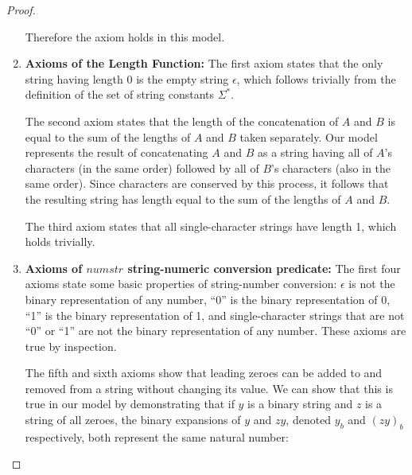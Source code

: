 \begin{proof}
\begin{enumerate}
  Therefore the axiom holds in this model.


\item \textbf{Axioms of the Length Function:} The first axiom states
  that the only string having length 0 is the empty string $\epsilon$,
  which follows trivially from the definition of the set of string
  constants $\Sigma^{*}$.

  The second axiom states that the length of the concatenation of $A$
  and $B$ is equal to the sum of the lengths of $A$ and $B$ taken
  separately.  Our model represents the result of concatenating $A$
  and $B$ as a string having all of $A$'s characters (in the same
  order) followed by all of $B$'s characters (also in the same
  order). Since characters are conserved by this process, it follows
  that the resulting string has length equal to the sum of the lengths
  of $A$ and $B$.

  The third axiom states that all single-character strings have length
  1, which holds trivially.


\item \textbf{Axioms of $numstr$ string-numeric conversion predicate:}
  The first four axioms state some basic properties of string-number
  conversion: $\epsilon$ is not the binary representation of any
  number, ``0'' is the binary representation of 0, ``1'' is the binary
  representation of 1, and single-character strings that are not ``0''
  or ``1'' are not the binary representation of any number. These
  axioms are true by inspection.

  The fifth and sixth axioms show that leading zeroes can be added to and removed from
  a string without changing its value. 
   We can show that this is true in our model by demonstrating that if $y$ is a binary string and $z$ is a string of all zeroes,
   the binary expansions of $y$ and $zy$, denoted $y_b$ and $(zy)_{b}$ respectively, both represent the same natural number:
  

\end{enumerate}
\end{proof}
